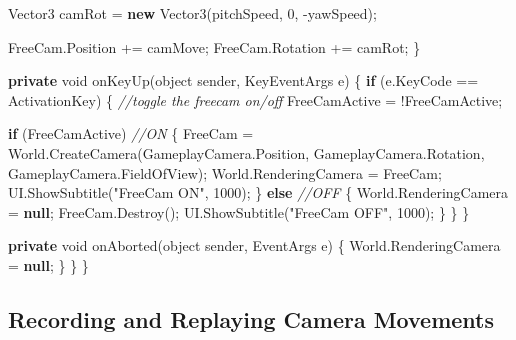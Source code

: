 \documentclass[
  openany]{book}
\newenvironment{Shaded}{\begin{snugshade}}{\end{snugshade}}
\newcommand{\CommentTok}[1]{\textcolor[rgb]{0.56,0.35,0.01}{\textit{#1}}}
\newcommand{\DataTypeTok}[1]{\textcolor[rgb]{0.13,0.29,0.53}{#1}}
\newcommand{\DecValTok}[1]{\textcolor[rgb]{0.00,0.00,0.81}{#1}}
\newcommand{\FunctionTok}[1]{\textcolor[rgb]{0.00,0.00,0.00}{#1}}
\newcommand{\KeywordTok}[1]{\textcolor[rgb]{0.13,0.29,0.53}{\textbf{#1}}}
\newcommand{\NormalTok}[1]{#1}
\newcommand{\StringTok}[1]{\textcolor[rgb]{0.31,0.60,0.02}{#1}}
\begin{document}
\begin{Shaded}
\begin{Highlighting}[]
\NormalTok{            Vector3 camRot = }\KeywordTok{new} \FunctionTok{Vector3}\NormalTok{(pitchSpeed, }\DecValTok{0}\NormalTok{, -yawSpeed);}

\NormalTok{            FreeCam.}\FunctionTok{Position}\NormalTok{ += camMove;}
\NormalTok{            FreeCam.}\FunctionTok{Rotation}\NormalTok{ += camRot;}
\NormalTok{        \}}

        \KeywordTok{private} \DataTypeTok{void} \FunctionTok{onKeyUp}\NormalTok{(}\DataTypeTok{object}\NormalTok{ sender, KeyEventArgs e)}
\NormalTok{        \{}
            \KeywordTok{if}\NormalTok{ (e.}\FunctionTok{KeyCode}\NormalTok{ == ActivationKey)}
\NormalTok{            \{}
                \CommentTok{//toggle the freecam on/off}
\NormalTok{                FreeCamActive = !FreeCamActive;}

                \KeywordTok{if}\NormalTok{ (FreeCamActive) }\CommentTok{//ON}
\NormalTok{                \{}
\NormalTok{                    FreeCam = World.}\FunctionTok{CreateCamera}\NormalTok{(GameplayCamera.}\FunctionTok{Position}\NormalTok{, GameplayCamera.}\FunctionTok{Rotation}\NormalTok{, GameplayCamera.}\FunctionTok{FieldOfView}\NormalTok{);}
\NormalTok{                    World.}\FunctionTok{RenderingCamera}\NormalTok{ = FreeCam;}
\NormalTok{                    UI.}\FunctionTok{ShowSubtitle}\NormalTok{(}\StringTok{"FreeCam ON"}\NormalTok{, }\DecValTok{1000}\NormalTok{);}
\NormalTok{                \}}
                \KeywordTok{else} \CommentTok{//OFF}
\NormalTok{                \{}
\NormalTok{                    World.}\FunctionTok{RenderingCamera}\NormalTok{ = }\KeywordTok{null}\NormalTok{;}
\NormalTok{                    FreeCam.}\FunctionTok{Destroy}\NormalTok{();}
\NormalTok{                    UI.}\FunctionTok{ShowSubtitle}\NormalTok{(}\StringTok{"FreeCam OFF"}\NormalTok{, }\DecValTok{1000}\NormalTok{);}
\NormalTok{                \}}
\NormalTok{            \}}
\NormalTok{        \}}

        \KeywordTok{private} \DataTypeTok{void} \FunctionTok{onAborted}\NormalTok{(}\DataTypeTok{object}\NormalTok{ sender, EventArgs e)}
\NormalTok{        \{}
\NormalTok{            World.}\FunctionTok{RenderingCamera}\NormalTok{ = }\KeywordTok{null}\NormalTok{;}
\NormalTok{        \}}
\NormalTok{    \}}
\NormalTok{\}}
    
\end{Highlighting}
\end{Shaded}

\hypertarget{recording-and-replaying-camera-movements}{%
\subsection*{Recording and Replaying Camera Movements}\label{recording-and-replaying-camera-movements}}
\end{document}
